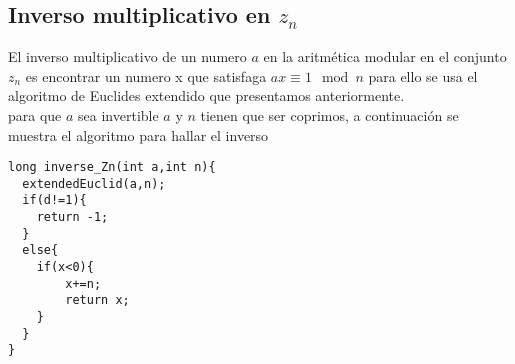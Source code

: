 \subsection{Inverso multiplicativo en $z_{n}$}
El inverso multiplicativo de un numero $a$ en la aritmética modular en el conjunto $z_{n}$ es encontrar un numero
x que satisfaga $ax \equiv 1 \mod{n}$ para ello se usa el algoritmo de Euclides extendido que presentamos anteriormente.\\
para que $a$ sea invertible $a$ y $n$ tienen que ser coprimos, a continuación se muestra el algoritmo para hallar el inverso
\begin{lstlisting}[style=C]
long inverse_Zn(int a,int n){
  extendedEuclid(a,n);
  if(d!=1){
  	return -1;
  }
  else{
  	if(x<0){
  		x+=n;
   		return x;
  	}
  }
}
\end{lstlisting}
